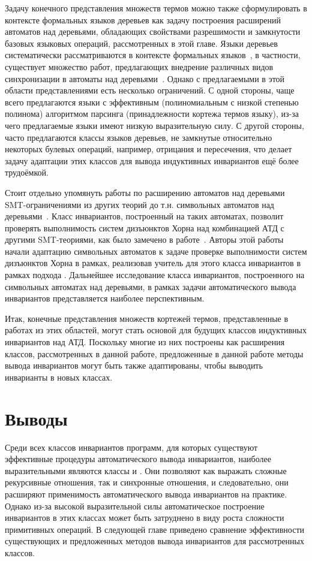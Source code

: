 Задачу конечного представления множеств термов можно также сформулировать в контексте формальных языков деревьев как задачу построения расширений автоматов над деревьями, обладающих свойствами разрешимости и замкнутости базовых языковых операций, рассмотренных в этой главе. Языки деревьев систематически рассматриваются в контексте формальных языков~\cite{10.5555/267871}, в частности, существует множество работ, предлагающих внедрение различных видов синхронизации в автоматы над деревьями~\cite{chabin2007visibly, gouranton2001synchronized, limet2001weakly, chabin2006synchronized, jacquemard2009rigid, engelfriet2017multiple}. Однако с предлагаемыми в этой области представлениями есть несколько ограничений. С одной стороны, чаще всего предлагаются языки с эффективным (полиномиальным с низкой степенью полинома) алгоритмом парсинга (принадлежности кортежа термов языку), из-за чего предлагаемые языки имеют низкую выразительную силу. С другой стороны, часто предлагаются классы языков деревьев, не замкнутые относительно некоторых булевых операций, например, отрицания и пересечения, что делает задачу адаптации этих классов для вывода индуктивных инвариантов ещё более трудоёмкой.

Стоит отдельно упомянуть работы по расширению автоматов над деревьями SMT-ограничениями из других теорий до т.\:н. символьных автоматов над деревьями~\cite{VEANES2015418,10.1145/2933575.2933578}. Класс инвариантов, построенный на таких автоматах, позволит проверять выполнимость систем дизъюнктов Хорна над комбинацией АТД с другими SMT-теориями, как было замечено в работе~\cite{10.1007/978-3-031-13188-2_13}. Авторы этой работы начали адаптацию символьных автоматов к задаче проверке выполнимости систем дизъюнктов Хорна в рамках, реализовав учитель для этого класса инвариантов в рамках подхода \ice{}. Дальнейшее исследование класса инвариантов, построенного на символьных автоматах над деревьями, в рамках задачи автоматического вывода инвариантов представляется наиболее перспективным.

Итак, конечные представления множеств кортежей термов, представленные в работах из этих областей, могут стать основой для будущих классов индуктивных инвариантов над АТД. Поскольку многие из них построены как расширения классов, рассмотренных в данной работе, предложенные в данной работе методы вывода инвариантов могут быть также адаптированы, чтобы выводить инварианты в новых классах.

\section{Выводы}
Среди всех классов инвариантов программ, для которых существуют эффективные процедуры автоматического вывода инвариантов, наиболее выразительными являются классы \syncRegFullClass{} и \regelemclass{}. Они позволяют как выражать сложные рекурсивные отношения, так и синхронные отношения, и следовательно, они расширяют применимость автоматического вывода инвариантов на практике. Однако из-за высокой выразительной силы автоматическое построение инвариантов в этих классах может быть затруднено в виду роста сложности примитивных операций.
В следующей главе приведено сравнение эффективности существующих и предложенных методов вывода инвариантов для рассмотренных классов.
